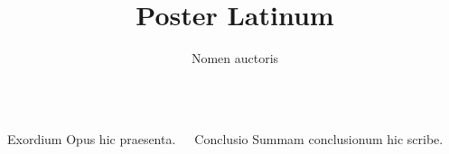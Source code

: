 \documentclass{beamer}
\title{Poster Latinum}
\author{Nomen auctoris}
\begin{document}
\begin{frame}
\begin{columns}[t]
  \begin{block}{Exordium}
    Opus hic praesenta.
  \end{block}
  \begin{block}{Conclusio}
    Summam conclusionum hic scribe.
  \end{block}
\end{columns}
\end{frame}
\end{document}
